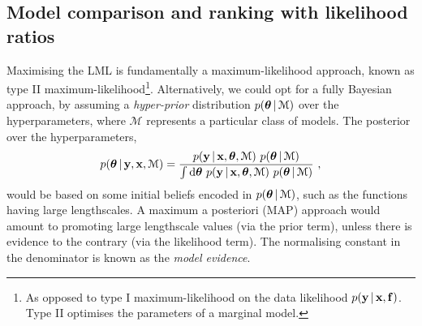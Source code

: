     \subsection{Model comparison and ranking with likelihood ratios}
      Maximising the LML is fundamentally a maximum-likelihood approach, known as type II maximum-likelihood\footnote{As opposed to type I maximum-likelihood on the data likelihood $p(\mathbf{y} \,|\, \mathbf{x},\mathbf{f})$.
      Type II optimises the parameters of a marginal model.}.
      Alternatively, we could opt for a fully Bayesian approach, by assuming a \textit{hyper-prior} distribution $p(\boldsymbol{\theta} \,|\, \mathcal{M})$ over the hyperparameters, where $\mathcal{M}$ represents a particular class of models.
      The posterior over the hyperparameters,
      \begin{equation} \label{equ:chap2_hyper_posterior}
	p(\boldsymbol{\theta} \,|\, \mathbf{y}, \mathbf{x}, \mathcal{M})
	  = \frac{ p(\mathbf{y} \,|\, \mathbf{x}, \boldsymbol{\theta}, \mathcal{M}) ~ p(\boldsymbol{\theta} \,|\, \mathcal{M}) }
	{ \int \textrm{d}\boldsymbol{\theta} ~ p(\mathbf{y} \,|\, \mathbf{x}, \boldsymbol{\theta}, \mathcal{M}) ~ p(\boldsymbol{\theta} \,|\, \mathcal{M})} ~,
      \end{equation}
      would be based on some initial beliefs encoded in $p(\boldsymbol{\theta} \,|\, \mathcal{M})$, such as the functions having large lengthscales.
      A maximum a posteriori (MAP) approach would amount to promoting large lengthscale values (via the prior term), unless there is evidence to the contrary (via the likelihood term).
      The normalising constant in the denominator is known as the \textit{model evidence}.

